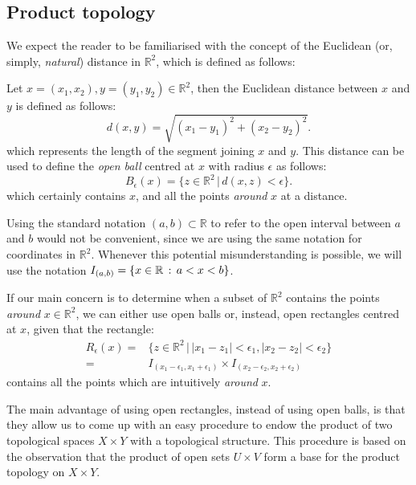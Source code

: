 \subsection{Product topology}\label{subsec:product-topology}

We expect the reader to be familiarised with the concept of the Euclidean (or, simply, \emph{natural}) distance
in $\mathbb{R}^2$, which is defined as follows:

Let $x=(x_1,x_2), y=(y_1,y_2)\in\mathbb{R}^2$, then the Euclidean distance between
$x$ and $y$ is defined as follows:
\begin{equation}
	d(x,y) = \sqrt{(x_1-y_1)^2+(x_2-y_2)^2}.\label{eq:euclidean-distance}
\end{equation}
which represents the length of the segment joining $x$ and $y$. This distance can be
used to define the \emph{open ball} centred at $x$ with radius $\epsilon$ as follows:
\begin{equation}
	B_\epsilon(x) = \{z\in\mathbb{R}^2\,|\,d(x,z)<\epsilon\}.
	\label{eq:open-ball}
\end{equation}
which certainly contains $x$, and all the points \emph{around} $x$ at a distance.

\begin{remark}
	Using the standard notation $(a,b)\subset\mathbb{R}$ to refer to the
	open interval between $a$ and $b$ would not be convenient, since we are using
	the same notation for coordinates in $\mathbb{R}^2$.
	Whenever this potential misunderstanding is possible, we will use the notation
	$I_{(a,b)} = \left\{x\in\mathbb{R}\,:\,a<x<b\right\}$.
\end{remark}

If our main concern is to determine when a subset of $\mathbb{R}^2$ contains the points
\emph{around} $x\in\mathbb{R}^2$, we can either use open balls or, instead, open
rectangles centred at $x$, given that the rectangle:
\begin{align*}
R_\epsilon(x) =& \{z\in\mathbb{R}^2\,|\,|x_1-z_1|<\epsilon_1, |x_2-z_2|<\epsilon_2\} \\
=& I_{(x_1-\epsilon_1, x_1+\epsilon_1)}\times I_{(x_2-\epsilon_2, x_2+\epsilon_2)}
\end{align*}
contains all the points which are intuitively \emph{around} $x$.

The main advantage of using open rectangles, instead of using open balls, is that
they allow us to come up with an easy procedure to endow the product
of two topological spaces $X \times Y$ with a topological structure.
This procedure is based on the observation that the product of open sets
$U \times V$ form a base for the product topology on $X\times Y$.